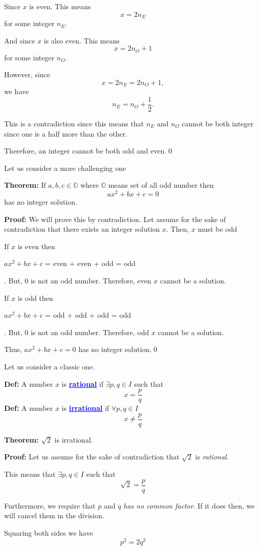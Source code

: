 \documentclass[a4paper, 12pt]{article}
\newcommand{\half}{\frac{1}{2}}
\newcommand{\definition}{\noindent\textbf{Def:} }
\newcommand{\theorem}{\noindent\textbf{Theorem:} }
\renewcommand{\proof}{\noindent\textbf{Proof:} }
\newcommand{\qedd}{\qed\newline}
\newcommand{\kwd}[1]{\textcolor{blue}{\textbf{\underline{#1}}}}
\theoremstyle{examplestyle}
\begin{document}
\begin{multicols}{2}
Since $x$ is even. This means
\[
	x = 2 n_E
\]
for some integer $n_E$.

And since $x$ is also even. This means
\[
	x = 2 n_O + 1
\]
for some integer $n_O$.

However, since
\[
	x = 2n_E = 2n_O + 1,
\]
we have
\[
	n_E = n_O+\half.
\]

This is a contradiction since this means that $n_E$ and $n_O$ cannot be both integer since one is a half more than the other.

Therefore, an integer cannot be both odd and even.\qedd

Let us consider a more challenging one

\noindent\theorem If $a,b,c \in \mathbb{O}$ where $\mathbb{O}$ means set of all odd number then\[
	ax^2 + bx + c = 0
\]
has no integer solution.

\noindent\proof We will prove this by contradiction. Let assume for the sake of contradiction that there exists an integer solution $x$. Then, $x$ must be odd

If $x$ is even then \begin{center}
	$ax^2 +bx +c$ = even + even + odd = odd
\end{center}. But, 0 is not an odd number. Therefore, even $x$ cannot be a solution.

If $x$ is odd then \begin{center}
	$ax^2 +bx + c$ = odd + odd + odd = odd
\end{center}. But, 0 is not an odd number. Therefore, odd $x$ cannot be a solution.

Thus, $ax^2 + bx + c = 0$ has no integer solution.\qedd

Let us consider a classic one.

\noindent\definition A number $x$ is \kwd{rational} if $\exists p,q \in I$ such that
\[
	x = \frac{p}{q}
\]
\noindent\definition A number $x$ is \kwd{irrational} if $\forall p,q \in I$
\[
	x \ne \frac{p}{q}
\]

\noindent\theorem $\sqrt{2}$ is irrational.

\noindent\proof Let us assume for the sake of contradiction that $\sqrt{2}$ is \emph{rational}.

This means that $\exists p,q \in I$ such that
\[
	\sqrt{2} = \frac{p}{q}
\]

Furthermore, we require that $p$ and $q$ \emph{has no common factor}. If it does then, we will cancel them in the division.

Squaring both sides we have
\begin{equation}
	p^2 = 2q^2
	\label{eq_sq21}
\end{equation}


\end{multicols}
\end{document}
